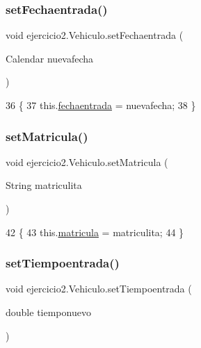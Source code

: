 \subsubsection{\texorpdfstring{set\+Fechaentrada()}{setFechaentrada()}}
{\footnotesize\ttfamily void ejercicio2.\+Vehiculo.\+set\+Fechaentrada (\begin{DoxyParamCaption}\item[{Calendar}]{nuevafecha }\end{DoxyParamCaption})\hspace{0.3cm}{\ttfamily [inline]}}


\begin{DoxyCode}
36                                                     \{
37         this.\mbox{\hyperlink{classejercicio2_1_1_vehiculo_a6358d487f847acdf071ab9612ae92cf2}{fechaentrada}} = nuevafecha;
38     \}
\end{DoxyCode}
\mbox{\label{classejercicio2_1_1_vehiculo_a839f602fe4695d9cb8d085bab398acd5}} 
\subsubsection{\texorpdfstring{set\+Matricula()}{setMatricula()}}
{\footnotesize\ttfamily void ejercicio2.\+Vehiculo.\+set\+Matricula (\begin{DoxyParamCaption}\item[{String}]{matriculita }\end{DoxyParamCaption})\hspace{0.3cm}{\ttfamily [inline]}}


\begin{DoxyCode}
42                                                 \{
43         this.\mbox{\hyperlink{classejercicio2_1_1_vehiculo_ad1079a268592164697f127dc2880c32b}{matricula}} = matriculita;
44     \}
\end{DoxyCode}
\mbox{\label{classejercicio2_1_1_vehiculo_a021e05ca70b02df5ff40d48692beb6ba}} 
\subsubsection{\texorpdfstring{set\+Tiempoentrada()}{setTiempoentrada()}}
{\footnotesize\ttfamily void ejercicio2.\+Vehiculo.\+set\+Tiempoentrada (\begin{DoxyParamCaption}\item[{double}]{tiemponuevo }\end{DoxyParamCaption})\hspace{0.3cm}{\ttfamily [inline]}}


